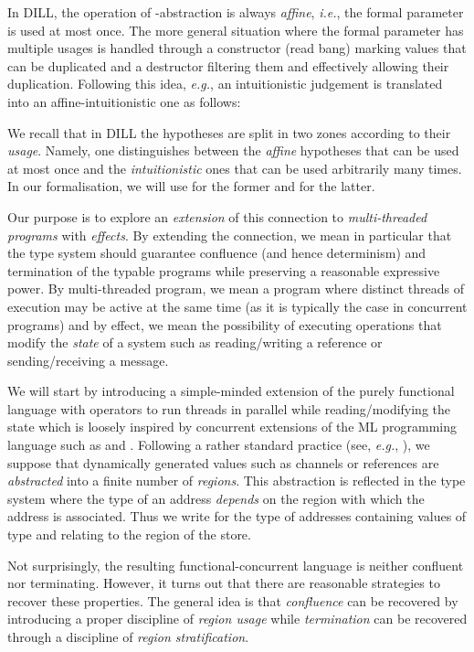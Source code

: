 \documentclass[11pt]{article}
\begin{document}
In DILL, the operation of -abstraction is
always {\em affine}, {\em i.e.}, the formal parameter is used at most
once.  The more general situation where the formal parameter has
multiple usages is handled through a constructor  (read bang) 
marking values that can be duplicated and a destructor  
filtering them and effectively allowing their
duplication. Following this idea, {\em e.g.},  an intuitionistic judgement 
is translated into an affine-intuitionistic one as follows:

{\footnotesize
}

We recall that in DILL the hypotheses are split in two zones according to their {\em usage}.
Namely, one distinguishes between the {\em affine} hypotheses 
that can be used at most once and the {\em intuitionistic} ones 
that can be used arbitrarily many times. In our formalisation, we will use 
for the former and  for the latter.

Our purpose is to explore an {\em extension} of this connection to {\em
multi-threaded programs} with {\em effects}. 
By extending the connection, we mean in particular
that the type system should guarantee confluence (and hence determinism) and termination
of the typable programs while preserving a reasonable expressive power.
By multi-threaded program, we mean a program where distinct threads of execution may be active at
the same time (as it is typically the case in concurrent programs) and by
effect, we mean the possibility of executing operations that modify
the {\em state} of a system such as reading/writing a reference or
sending/receiving a message. 


We will start by introducing a simple-minded extension of the purely
functional language with operators to run threads in parallel while
reading/modifying the state which is loosely inspired by concurrent
extensions of the ML programming language such as 
\cite{GMP89} and \cite{Reppy91}.  Following a rather
standard practice (see, {\em e.g.}, \cite{LG88,TT97}), we suppose that
dynamically generated values such as channels or references  are
{\em abstracted} into a finite number of {\em regions}. This abstraction is
reflected in the type system where the type of an address {\em
depends} on the region with which the address is associated. Thus we 
write  for the type of addresses containing values of
type  and relating to the region  of the store.


Not surprisingly, the resulting functional-concurrent language is
neither confluent nor terminating.  However, it turns out that there are reasonable
strategies to recover these properties.  The general idea is that {\em
confluence} can be recovered by introducing a proper discipline of
{\em region usage} while {\em termination} can be recovered through a
discipline of {\em region stratification}.
\end{document}
